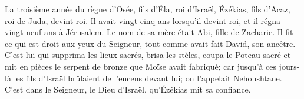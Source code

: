 La troisième année du règne d’Osée, fils d’Éla, roi d’Israël,
	Ézékias, fils d’Acaz, roi de Juda, devint roi.
Il avait vingt-cinq ans lorsqu’il devint roi, et il régna vingt-neuf ans à Jérusalem.
	Le nom de sa mère était Abi, fille de Zacharie.
Il fit ce qui est droit aux yeux du Seigneur, tout comme avait fait David, son ancêtre.
C’est lui qui supprima les lieux sacrés, brisa les stèles, coupa le Poteau sacré
	et mit en pièces le serpent de bronze que Moïse avait fabriqué;
	car jusqu’à ces jours-là les fils d’Israël brûlaient de l’encens devant lui;
	on l’appelait Nehoushtane.
C’est dans le Seigneur, le Dieu d’Israël, qu’Ézékias mit sa confiance.

